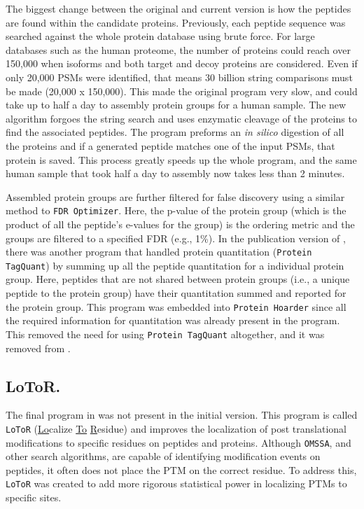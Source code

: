 The biggest change between the original and current version is how the peptides are found within the candidate proteins. Previously, each peptide sequence was searched against the whole protein database using brute force. For large databases such as the human proteome, the number of proteins could reach over 150,000 when isoforms and both target and decoy proteins are considered. Even if only 20,000 PSMs were identified, that means 30 billion string comparisons must be made (20,000 x 150,000). This made the original program very slow, and could take up to half a day to assembly protein groups for a human sample. The new algorithm forgoes the string search and uses enzymatic cleavage of the proteins to find the associated peptides. The program preforms an \emph{in silico} digestion of all the proteins and if a generated peptide matches one of the input PSMs, that protein is saved. This process greatly speeds up the whole program, and the same human sample that took half a day to assembly now takes less than 2 minutes. 

Assembled protein groups are further filtered for false discovery using a similar method to \texttt{FDR Optimizer}. Here, the p-value of the protein group (which is the product of all the peptide's e-values for the group) is the ordering metric and the groups are filtered to a specified FDR (e.g., 1\%). In the publication version of \compass{}, there was another program that handled protein quantitation (\texttt{Protein TagQuant}) by summing up all the peptide quantitation for a individual protein group. Here, peptides that are not shared between protein groups (i.e., a unique peptide to the protein group) have their quantitation summed and reported for the protein group. This program was embedded into \texttt{Protein Hoarder} since all the required information for quantitation was already present in the program. This removed the need for using \texttt{Protein TagQuant} altogether, and it was removed from \compass{}. 

\subsection*{LoToR.}
The final program in \compass{} was not present in the initial version. This program is called \texttt{LoToR} (\underline{Lo}calize \underline{To} \underline{R}esidue) and improves the localization of post translational modifications to specific residues on peptides and proteins. Although \texttt{OMSSA}, and other search algorithms, are capable of identifying modification events on peptides, it often does not place the PTM on the correct residue. To address this, \texttt{LoToR} was created to add more rigorous statistical power in localizing PTMs to specific sites. 

